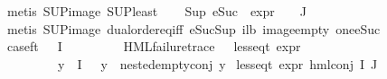 \begin{isabellebody}
\ {\isacharparenleft}{\kern0pt}metis\ SUP{\isacharunderscore}{\kern0pt}image\ SUP{\isacharunderscore}{\kern0pt}least{\isacharparenright}{\kern0pt}{\isacharplus}{\kern0pt}\isanewline
\ \ \isamarkupfalse%
\ {\isachardoublequoteopen}Sup\ {\isacharparenleft}{\kern0pt}{\isacharparenleft}{\kern0pt}eSuc\ {\isasymcirc}\ expr{\isacharunderscore}{\kern0pt}{}\ {\isasymcirc}\ {\isasymPhi}{\isacharparenright}{\kern0pt}\ {\isacharbackquote}{\kern0pt}\ J{\isacharparenright}{\kern0pt}\ {\isasymle}\ {}{\isachardoublequoteclose}\isanewline
\ \ \ \ \isamarkupfalse%
\ {\isacharparenleft}{\kern0pt}metis\ SUP{\isacharunderscore}{\kern0pt}image\ dual{\isacharunderscore}{\kern0pt}order{\isachardot}{\kern0pt}eq{\isacharunderscore}{\kern0pt}iff\ eSuc{\isacharunderscore}{\kern0pt}Sup\ i{}{\isacharunderscore}{\kern0pt}lb\ image{\isacharunderscore}{\kern0pt}empty\ one{\isacharunderscore}{\kern0pt}eSuc{\isacharparenright}{\kern0pt}\isanewline
\isanewline
\ \ \isamarkupfalse%
\ case{\isacharunderscore}{\kern0pt}ft{\isacharcolon}{\kern0pt}\ {\isachardoublequoteopen}{\isacharparenleft}{\kern0pt}{\isasymexists}{\isasympsi}{\isasymin}{\isasymPhi}\ {\isacharbackquote}{\kern0pt}\ I{\isachardot}{\kern0pt}\isanewline
\ \ \ \ \ \ \ \ \ {\isacharparenleft}{\kern0pt}HML{\isacharunderscore}{\kern0pt}failure{\isacharunderscore}{\kern0pt}trace\ {\isasympsi}\ {\isasymand}\ less{\isacharunderscore}{\kern0pt}eq{\isacharunderscore}{\kern0pt}t\ {\isacharparenleft}{\kern0pt}expr\ {\isasympsi}{\isacharparenright}{\kern0pt}\ {\isacharparenleft}{\kern0pt}{\isasyminfinity}{\isacharcomma}{\kern0pt}\ {\isasyminfinity}{\isacharcomma}{\kern0pt}\ {\isasyminfinity}{\isacharcomma}{\kern0pt}\ {}{\isacharcomma}{\kern0pt}\ {}{\isacharcomma}{\kern0pt}\ {}{\isacharparenright}{\kern0pt}{\isacharparenright}{\kern0pt}\ {\isasymand}\isanewline
\ \ \ \ \ \ \ \ \ {\isacharparenleft}{\kern0pt}{\isasymforall}y{\isasymin}{\isasymPhi}\ {\isacharbackquote}{\kern0pt}\ I{\isachardot}{\kern0pt}\ {\isasympsi}\ {\isasymnoteq}\ y\ {\isasymlongrightarrow}\ nested{\isacharunderscore}{\kern0pt}empty{\isacharunderscore}{\kern0pt}conj\ y{\isacharparenright}{\kern0pt}{\isacharparenright}{\kern0pt}\isanewline
{\isasymlongrightarrow}\ less{\isacharunderscore}{\kern0pt}eq{\isacharunderscore}{\kern0pt}t\ {\isacharparenleft}{\kern0pt}expr\ {\isacharparenleft}{\kern0pt}hml{\isacharunderscore}{\kern0pt}conj\ I\ J\ {\isasymPhi}{\isacharparenright}{\kern0pt}{\isacharparenright}{\kern0pt}\ {\isacharparenleft}{\kern0pt}{\isasyminfinity}{\isacharcomma}{\kern0pt}\ {\isasyminfinity}{\isacharcomma}{\kern0pt}\ {\isasyminfinity}{\isacharcomma}{\kern0pt}\ {}{\isacharcomma}{\kern0pt}\ {}{\isacharcomma}{\kern0pt}\ {}{\isacharparenright}{\kern0pt}{\isachardoublequoteclose}\isanewline

\end{isabellebody}
